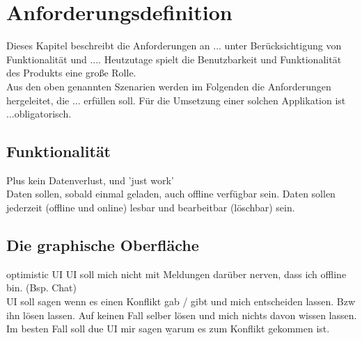 \chapter{\label{chap:anforderungen}Anforderungsdefinition}
Dieses Kapitel beschreibt die Anforderungen an ... unter Berücksichtigung von Funktionalität und ....
Heutzutage spielt die Benutzbarkeit und Funktionalität des Produkts eine große Rolle.\\
Aus den oben genannten Szenarien werden im Folgenden die Anforderungen hergeleitet, die ... erfüllen soll.
Für die Umsetzung einer solchen Applikation ist ...obligatorisch.
%
%

%
%
\section{Funktionalität}
 Plus kein Datenverlust, und 'just work'\\
Daten sollen, sobald einmal geladen, auch offline verfügbar sein.
Daten sollen jederzeit (offline und online) lesbar und bearbeitbar (löschbar) sein.
%
%
\section{Die graphische Oberfläche}
\Gls{optimistic UI}
\gls{UI} soll mich nicht mit Meldungen darüber nerven, dass ich offline bin. (Bsp. Chat)\\
\gls{UI} soll sagen wenn es einen Konflikt gab / gibt und mich entscheiden lassen. Bzw ihn lösen lassen.
Auf keinen Fall selber lösen und mich nichts davon wissen lassen.\\
Im besten Fall soll due UI mir sagen \b{warum} es zum Konflikt gekommen ist.